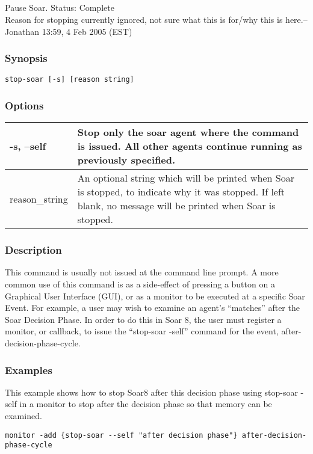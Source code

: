 \subsection{}
\label{stop-soar}
Pause Soar. 
 Status: Complete\\ 
Reason for stopping currently ignored, not sure what this is for/why this is here.--Jonathan 13:59, 4 Feb 2005 (EST) 
\subsubsection*{Synopsis}
\begin{verbatim}
stop-soar [-s] [reason string]
\end{verbatim}
\subsubsection*{Options}
\begin{tabular}{|l|l|}
\hline 
 -s, --self  & Stop only the soar agent where the command is issued. All other agents continue running as previously specified.  \\
 \hline 
 reason\_string  & An optional string which will be printed when Soar is stopped, to indicate why it was stopped. If left blank, no message will be printed when Soar is stopped.  \\
 \hline 
\end{tabular}
\subsubsection*{Description}
 This command is usually not issued at the command line prompt. A more common use of this command is as a side-effect of pressing a button on a Graphical User Interface (GUI), or as a monitor to be executed at a specific Soar Event. For example, a user may wish to examine an agent's ``matches'' after the Soar Decision Phase. In order to do this in Soar 8, the user must register a monitor, or callback, to issue the ``stop-soar -self'' command for the event, after-decision-phase-cycle. 
\subsubsection*{Examples}
 This example shows how to stop Soar8 after this decision phase using stop-soar -self in a monitor to stop after the decision phase so that memory can be examined. \begin{verbatim}
monitor -add {stop-soar --self "after decision phase"} after-decision-phase-cycle
\end{verbatim}
